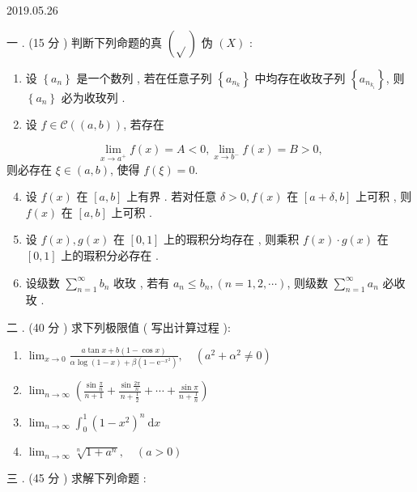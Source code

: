 \documentclass[10pt]{article}
\begin{document}
   

2019.05.26

 一 . (15  分 )  判断下列命题的真  $(\sqrt{ })$  伪  $(X)$ :

\begin{enumerate}
  \item  设  $\left\{a_{n}\right\}$  是一个数列 ,  若在任意子列  $\left\{a_{n_{k}}\right\}$  中均存在收玫子列  $\left\{a_{n_{k_{i}}}\right\}$,  则  $\left\{a_{n}\right\}$  必为收玫列 .

  \item  设  $f \in \mathcal{C}((a, b))$,  若存在 

\end{enumerate}
$$
\lim _{x \rightarrow a^{+}} f(x)=A<0, \lim _{x \rightarrow b^{-}} f(x)=B>0,
$$
 则必存在  $\xi \in(a, b)$,  使得  $f(\xi)=0$.

\begin{enumerate}
  \setcounter{enumi}{3}
  \item  设  $f(x)$  在  $[a, b]$  上有界 .  若对任意  $\delta>0, f(x)$  在  $[a+\delta, b]$  上可积 ,  则  $f(x)$  在  $[a, b]$  上可积 .

  \item  设  $f(x), g(x)$  在  $[0,1]$  上的瑕积分均存在 ,  则乘积  $f(x) \cdot g(x)$  在  $[0,1]$  上的瑕积分必存在 .

  \item  设级数  $\sum_{n=1}^{\infty} b_{n}$  收玫 ,  若有  $a_{n} \leqslant b_{n},(n=1,2, \cdots)$,  则级数  $\sum_{n=1}^{\infty} a_{n}$  必收玫 .

\end{enumerate}
 二 . (40  分 )  求下列极限值  ( 写出计算过程 ):

\begin{enumerate}
  \item $\lim _{x \rightarrow 0} \frac{a \tan x+b(1-\cos x)}{\alpha \log (1-x)+\beta\left(1-\mathrm{e}^{-x^{2}}\right)}, \quad\left(a^{2}+\alpha^{2} \neq 0\right)$

  \item $\lim _{n \rightarrow \infty}\left(\frac{\sin \frac{\pi}{n}}{n+1}+\frac{\sin \frac{2 \pi}{n}}{n+\frac{1}{2}}+\cdots+\frac{\sin \pi}{n+\frac{1}{n}}\right)$

  \item $\lim _{n \rightarrow \infty} \int_{0}^{1}\left(1-x^{2}\right)^{n} \mathrm{~d} x$

  \item $\lim _{n \rightarrow \infty} \sqrt[n]{1+a^{n}}, \quad(a>0)$

\end{enumerate}
 三 . (45  分 )  求解下列命题 :
\end{document}
